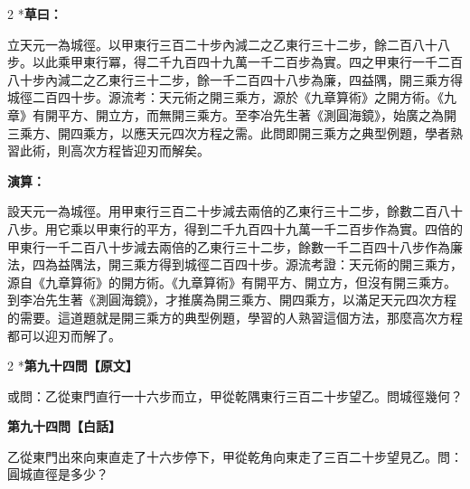 \documentclass[11pt,a4paper]{article}
\begin{document}
\begin{paracol}{2}
\switchcolumn[0]*\textbf{草曰：}

\small 立天元一為城徑。以甲東行三百二十步內減二之乙東行三十二步，餘二百八十八步。以此乘甲東行冪，得二千九百四十九萬一千二百步為實。四之甲東行一千二百八十步內減二之乙東行三十二步，餘一千二百四十八步為廉，四益隅，開三乘方得城徑二百四十步。源流考：天元術之開三乘方，源於《九章算術》之開方術。《九章》有開平方、開立方，而無開三乘方。至李冶先生著《測圓海鏡》，始廣之為開三乘方、開四乘方，以應天元四次方程之需。此問即開三乘方之典型例題，學者熟習此術，則高次方程皆迎刃而解矣。

\switchcolumn\textbf{演算：}

\small 設天元一為城徑。用甲東行三百二十步減去兩倍的乙東行三十二步，餘數二百八十八步。用它乘以甲東行的平方，得到二千九百四十九萬一千二百步作為實。四倍的甲東行一千二百八十步減去兩倍的乙東行三十二步，餘數一千二百四十八步作為廉法，四為益隅法，開三乘方得到城徑二百四十步。源流考證：天元術的開三乘方，源自《九章算術》的開方術。《九章算術》有開平方、開立方，但沒有開三乘方。到李冶先生著《測圓海鏡》，才推廣為開三乘方、開四乘方，以滿足天元四次方程的需要。這道題就是開三乘方的典型例題，學習的人熟習這個方法，那麼高次方程都可以迎刃而解了。
\end{paracol}

\vspace{0.1cm}
\noindent{}
\par\vspace{0.3cm}

\begin{paracol}{2}
\switchcolumn[0]*\noindent\textbf{第九十四問【原文】}

\small 或問：乙從東門直行一十六步而立，甲從乾隅東行三百二十步望乙。問城徑幾何？

\switchcolumn\noindent\textbf{第九十四問【白話】}

\small 乙從東門出來向東直走了十六步停下，甲從乾角向東走了三百二十步望見乙。問：圓城直徑是多少？
\end{paracol}

\vspace{0.1cm}
\noindent{}
\par\vspace{0.15cm}
\end{document}
